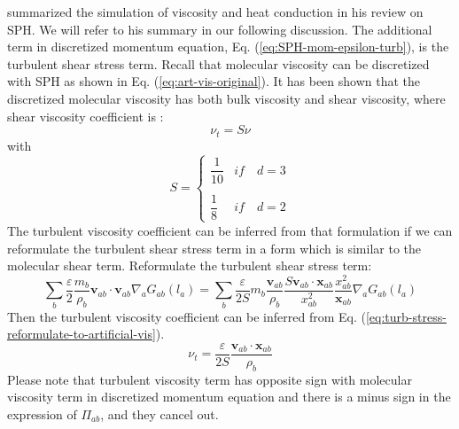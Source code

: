 \documentclass[journal abbreviation, manuscript]{copernicus}
\begin{document}
\citet{monaghan2005smoothed} summarized the simulation of viscosity and heat conduction in his review on SPH. We will refer to his summary in our following discussion. The additional term in discretized momentum equation, Eq. (\ref{eq:SPH-mom-epsilon-turb}), is the turbulent shear stress term. 
Recall that molecular viscosity can be discretized with SPH as shown in Eq. (\ref{eq:art-vis-original}). 
It has been shown that the discretized molecular viscosity has both bulk viscosity and shear viscosity, where shear viscosity coefficient is \citep{monaghan2005smoothed}:
\begin{equation}
\nu_t = S \nu
\end{equation}
with
\begin{equation}
S= 
\begin{cases} 
      \dfrac{1}{10} & if  \quad d=3 \\
      \\
     \dfrac{1}{8}  & if  \quad d=2 
\end{cases}
\end{equation}
The turbulent viscosity coefficient can be inferred from that formulation if we can reformulate the turbulent shear stress term in a form which is similar to the molecular shear term.
Reformulate the turbulent shear stress term:
\begin{equation}
\label{eq:turb-stress-reformulate-to-artificial-vis}
 \sum_b \dfrac{\varepsilon}{2} \dfrac{m_b}{\rho_b} \textbf{v}_{ab} \cdot \textbf{v}_{ab} \nabla_a G_{ab}\left(l_a\right)= \sum_b \dfrac{\varepsilon}{2S} m_b \dfrac{\textbf{v}_{ab}}{\rho_b} \dfrac{S \textbf{v}_{ab} \cdot \textbf{x}_{ab}}{x_{ab}^2} \dfrac{x_{ab}^2}{\textbf{x}_{ab}} \nabla_a G_{ab}\left(l_a\right) 
\end{equation}
Then the turbulent viscosity coefficient can be inferred from Eq. (\ref{eq:turb-stress-reformulate-to-artificial-vis}).
\begin{equation}
\nu_t = \dfrac{\varepsilon}{2S} \dfrac{\textbf{v}_{ab} \cdot \textbf{x}_{ab}}{\rho_b}
\end{equation}
Please note that turbulent viscosity term has opposite sign with molecular viscosity term in discretized momentum equation and there is a minus sign in the expression of $\Pi_{ab}$, and they cancel out.
\end{document}
